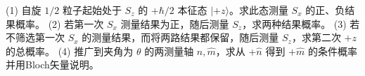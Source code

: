 (1) 自旋 \(1/2\) 粒子起始处于 \(S_z\) 的 \(+\hbar/2\) 本征态 \(|+z\rangle\)。求此态测量 \(S_x\) 的正、负结果概率。
(2) 若第一次 \(S_x\) 测量结果为正，随后测量 \(S_z\)，求两种结果概率。
(3) 若不筛选第一次 \(S_x\) 的测量结果，而将两路结果都保留，随后测量 \(S_z\)，求第二次 \(+z\) 的总概率。
(4) 推广到夹角为 \(\theta\) 的两测量轴 \(\hat n,\hat m\)，求从 \(+\hat n\) 得到 \(+\hat m\) 的条件概率并用Bloch矢量说明。
